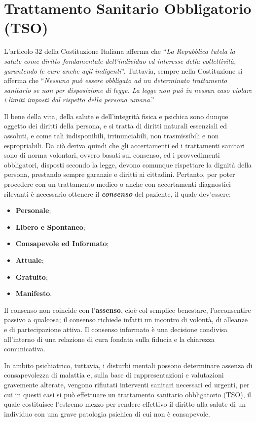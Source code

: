 \section{Trattamento Sanitario Obbligatorio (TSO)}

L'articolo 32 della Costituzione Italiana afferma che ``\emph{La
Repubblica tutela la salute come diritto fondamentale dell'individuo ed
interesse della collettività, garantendo le cure anche agli
indigenti}''. Tuttavia, sempre nella Costituzione si afferma che
``\emph{Nessuno può essere obbligato ad un determinato trattamento
sanitario se non per disposizione di legge. La legge non può in nessun
caso violare i limiti imposti dal rispetto della persona umana}.''

Il bene della vita, della salute e dell'integrità fisica e psichica sono
dunque oggetto dei diritti della persona, e si tratta di diritti
naturali essenziali ed assoluti, e come tali indisponibili,
irrinunciabili, non trasmissibili e non espropriabili. Da ciò deriva
quindi che gli accertamenti ed i trattamenti sanitari sono di norma
volontari, ovvero basati sul consenso, ed i provvedimenti obbligatori,
disposti secondo la legge, devono comunque rispettare la dignità della
persona, prestando sempre garanzie e diritti ai cittadini. Pertanto, per
poter procedere con un trattamento medico o anche con accertamenti
diagnostici rilevanti è necessario ottenere il \textbf{\emph{consenso}}
del paziente, il quale dev'essere:

\begin{itemize}
\item
  \textbf{Personale};
\item
  \textbf{Libero e Spontaneo};
\item
  \textbf{Consapevole ed Informato};
\item
  \textbf{Attuale};
\item
  \textbf{Gratuito};
\item
  \textbf{Manifesto}.
\end{itemize}

Il consenso non coincide con l'\textbf{assenso}, cioè col semplice
benestare, l'acconsentire passivo a qualcosa; il consenso richiede
infatti un incontro di volontà, di alleanze e di partecipazione attiva.
Il consenso informato è una decisione condivisa all'interno di una
relazione di cura fondata sulla fiducia e la chiarezza comunicativa.

In ambito psichiatrico, tuttavia, i disturbi mentali possono determinare
assenza di consapevolezza di malattia e, sulla base di rappresentazioni
e valutazioni gravemente alterate, vengono rifiutati interventi sanitari
necessari ed urgenti, per cui in questi casi si può effettuare un
trattamento sanitario obbligatorio (TSO), il quale costituisce l'estremo
mezzo per rendere effettivo il diritto alla salute di un individuo con
una grave patologia psichica di cui non è consapevole.

